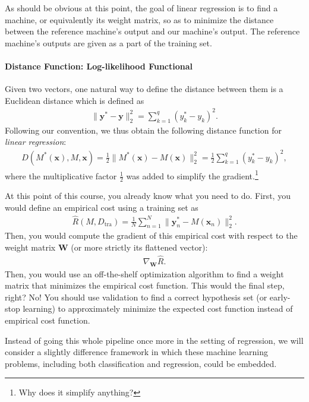 \documentclass{report}
\newcommand{\vect}[1]{\mathbf{#1}}
\newcommand{\matr}[1]{\mathbf{#1}}
\newcommand{\vx}[0]{\vect{x}}
\newcommand{\vy}[0]{\vect{y}}
\newcommand{\mW}[0]{\matr{W}}
\newcommand{\tra}{\text{tra}}
\begin{document}
As should be obvious at this point, the goal of linear regression is to find a
machine, or equivalently its weight matrix, so as to minimize the distance
between the reference machine's output and our machine's output. The reference
machine's outputs are given as a part of the training set.

\paragraph{Distance Function: Log-likelihood Functional}

Given two vectors, one natural way to define the distance between them is a
Euclidean distance which is defined as
\begin{align*}
    \|\vy^* - \vy\|_2^2 = \sum_{k=1}^q (y^*_k - y_k)^2.
\end{align*}
Following our convention, we thus obtain the following distance function for
{\it linear regression}:
\begin{align}
    \label{eq:linreg_dist}
    D(M^*(\vx), M, \vx) = \frac{1}{2} \|M^*(\vx) - M(\vx)\|_2^2 = 
    \frac{1}{2} \sum_{k=1}^q (y^*_k - y_k)^2,
\end{align}
where the multiplicative factor $\frac{1}{2}$ was added to simplify the
gradient.\footnote{
    Why does it simplify anything?
}

At this point of this course, you already know what you need to do. First, you
would define an empirical cost using a training set as
\begin{align*}
    \hat{R}(M, D_{\tra}) = \frac{1}{N} \sum_{n=1}^N
    \|\vy^*_n - M(\vx_n)\|^2_2.
\end{align*}
Then, you would compute the gradient of this empirical cost with respect to the
weight matrix $\mW$ (or more strictly its flattened vector):
\begin{align*}
    \nabla_{\mW} \hat{R}.
\end{align*}
Then, you would use an off-the-shelf optimization algorithm to find a weight
matrix that minimizes the empirical cost function. This would the final step,
right? No! You should use validation to find a correct hypothesis set (or
early-stop learning) to approximately minimize the expected cost function
instead of empirical cost function.

Instead of going this whole pipeline once more in the setting of regression, we
will consider a slightly difference framework in which these machine learning
problems, including both classification and regression, could be embedded. 
\end{document}

